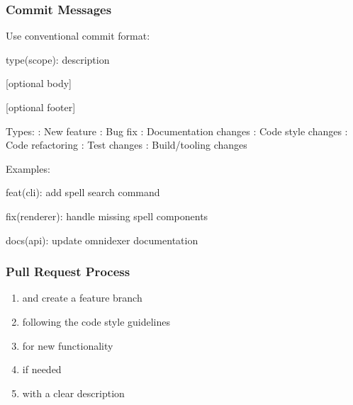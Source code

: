 \documentclass[letterpaper,10pt,english]{sphinxmanual}
\begin{document}
\subsubsection{Commit Messages}
\label{\detokenize{developer/contributing:commit-messages}}
\sphinxAtStartPar
Use conventional commit format:

\begin{sphinxVerbatim}[commandchars=\\\{\}]
type(scope): description

[optional body]

[optional footer]
\end{sphinxVerbatim}

\sphinxAtStartPar
Types:
\sphinxhyphen{} : New feature
\sphinxhyphen{} : Bug fix
\sphinxhyphen{} : Documentation changes
\sphinxhyphen{} : Code style changes
\sphinxhyphen{} : Code refactoring
\sphinxhyphen{} : Test changes
\sphinxhyphen{} : Build/tooling changes

\sphinxAtStartPar
Examples:

\begin{sphinxVerbatim}[commandchars=\\\{\}]
feat(cli): add spell search command

fix(renderer): handle missing spell components

docs(api): update omnidexer documentation
\end{sphinxVerbatim}


\subsubsection{Pull Request Process}
\label{\detokenize{developer/contributing:pull-request-process}}\begin{enumerate}
%
\item {} 
\sphinxAtStartPar
{} and create a feature branch

\item {} 
\sphinxAtStartPar
{} following the code style guidelines

\item {} 
\sphinxAtStartPar
{} for new functionality

\item {} 
\sphinxAtStartPar
{} if needed

\item {} 
\sphinxAtStartPar
{} with a clear description

\end{enumerate}
\end{document}
